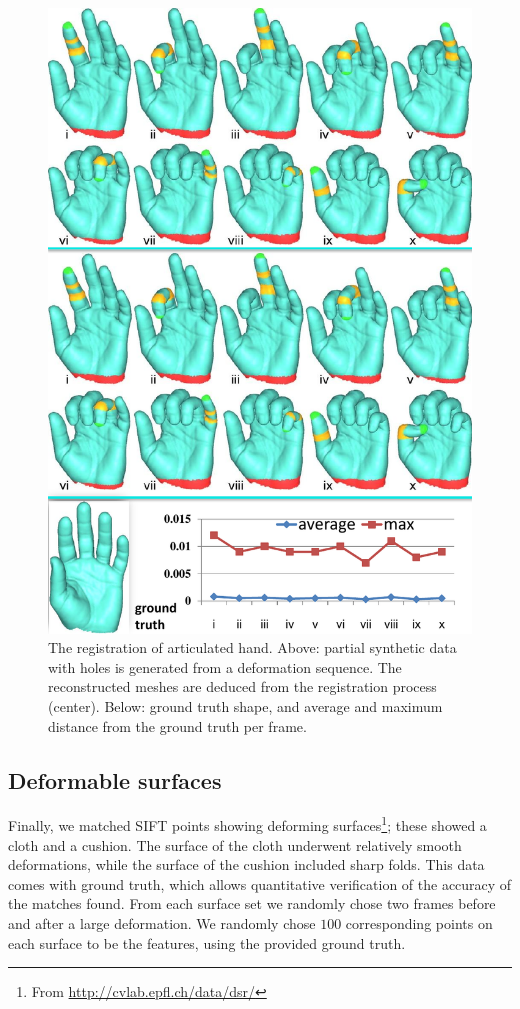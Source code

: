 \begin{figure}[h]
\centering
  \includegraphics[width=0.95\linewidth]{figures/3DHand.pdf}
  \caption{The registration of articulated hand.
  Above: partial synthetic data with holes is generated from a deformation sequence. 
  The reconstructed meshes are deduced from the registration process (center).
  Below: ground truth shape, and average and maximum distance from the ground truth per frame.}
\label{fig:3DHand}
\end{figure}

\subsection{Deformable surfaces}
\label{subsec:2DDeformable}

Finally, we matched SIFT points showing deforming surfaces\footnote{From \url{http://cvlab.epfl.ch/data/dsr/}}; these showed a cloth and a cushion.
The surface of the cloth underwent relatively smooth deformations, while the surface of the cushion included sharp folds.
This data comes with ground truth, which allows quantitative verification of the accuracy of the matches found.
From each surface set we randomly chose two frames before and after a large deformation.
We randomly chose $100$ corresponding points on each surface to be the features, using the provided ground truth.

